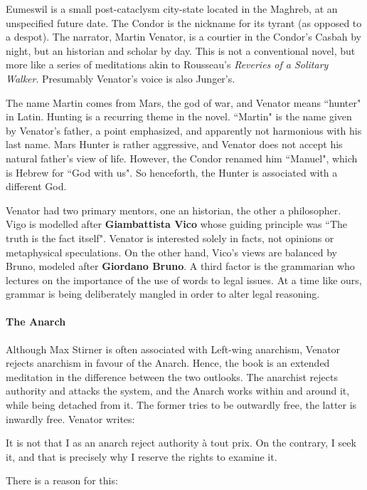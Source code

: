 Eumeswil is a small post-cataclysm city-state located in the Maghreb, at an unspecified future date. The Condor is the nickname for its tyrant (as opposed to a despot). The narrator, Martin Venator, is a courtier in the Condor's Casbah by night, but an historian and scholar by day. This is not a conventional novel, but more like a series of meditations akin to Rousseau's \emph{Reveries of a Solitary Walker}. Presumably Venator's voice is also Junger's.

The name Martin comes from Mars, the god of war, and Venator means ``hunter" in Latin. Hunting is a recurring theme in the novel. ``Martin" is the name given by Venator's father, a point emphasized, and apparently not harmonious with his last name. Mars Hunter is rather aggressive, and Venator does not accept his natural father's view of life. However, the Condor renamed him ``Manuel", which is Hebrew for ``God with us". So henceforth, the Hunter is associated with a different God.

Venator had two primary mentors, one an historian, the other a philosopher. Vigo is modelled after \textbf{Giambattista Vico} whose guiding principle was ``The truth is the fact itself". Venator is interested solely in facts, not opinions or metaphysical speculations. On the other hand, Vico's views are balanced by Bruno, modeled after \textbf{Giordano Bruno}. A third factor is the grammarian who lectures on the importance of the use of words to legal issues. At a time like ours, grammar is being deliberately mangled in order to alter legal reasoning.

\paragraph{The Anarch}
Although Max Stirner is often associated with Left-wing anarchism, Venator rejects anarchism in favour of the Anarch. Hence, the book is an extended meditation in the difference between the two outlooks. The anarchist rejects authority and attacks the system, and the Anarch works within and around it, while being detached from it. The former tries to be outwardly free, the latter is inwardly free. Venator writes:

\begin{quotex}
It is not that I as an anarch reject authority à tout prix. On the contrary, I seek it, and that is precisely why I reserve the rights to examine it. 

\end{quotex}
There is a reason for this:

